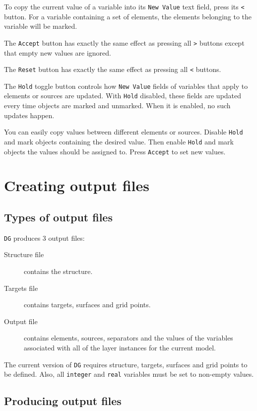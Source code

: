 \documentclass[a4paper,10pt]{report}
\begin{document}
To copy the current value of a variable into its {\tt New Value}
text field, press its {\tt <} button. For a variable containing a
set of elements, the elements belonging to the variable will be
marked.

The {\tt Accept} button has exactly the same effect as pressing all {\tt >}
buttons except that empty new values are ignored.

The {\tt Reset} button has exactly the same effect as pressing all
{\tt <} buttons.

The {\tt Hold} toggle button controls how {\tt New Value} fields of
variables that apply to elements or sources are updated. With
{\tt Hold}  disabled, these fields are updated every time objects are
marked and unmarked. When it is enabled, no such updates happen.

You can easily copy values between different elements or sources.
Disable {\tt Hold} and mark objects containing the desired value.
Then enable {\tt Hold} and mark objects the values should be assigned
to. Press {\tt Accept} to set new values.

\section{Creating output files}

\subsection{Types of output files}

{\tt DG} produces 3 output files:
\begin{description}
  \item[Structure file] contains the structure.
  \item[Targets file] contains targets, surfaces and grid
points.
  \item[Output file] contains elements, sources, separators
and the values of the variables associated with all of the
layer instances for the current model.
\end{description}

The current version of {\tt DG} requires structure, targets, surfaces and grid
points to be defined. Also, all {\tt integer} and {\tt real} variables must be set
to non-empty values.

\subsection{Producing output files}
\end{document}
